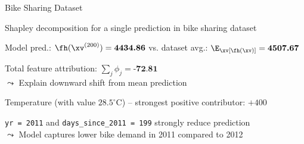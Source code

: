 \documentclass[10pt,compress,t,notes=noshow, xcolor=table]{beamer}
\begin{document}
\begin{framev}[align=top]{Bike Sharing Dataset}

\begin{itemizeM}%
\item Shapley decomposition for a single prediction in bike sharing dataset %
\item Model pred.: $\fh(\xv^{(200)}) = \textbf{4434.86}$ vs. dataset avg.: $\E_\xv[\fh(\xv)] = \textbf{4507.67}$
\item Total feature attribution: $\sum_j \phi_j = \textbf{-72.81}$\\
$\leadsto$ Explain downward shift from mean prediction
\item Temperature (with value $28.5^\circ$C) -- strongest positive contributor: $+400$
\item \texttt{yr = 2011} and \texttt{days\_since\_2011 = 199} strongly reduce prediction\\
$\leadsto$ Model captures lower bike demand in 2011 compared to 2012
\end{itemizeM}
\end{framev}



\end{document}
